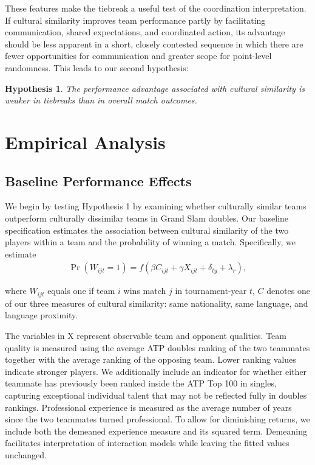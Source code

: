 \documentclass[10pt]{article}
\newtheorem{hypothesis}{Hypothesis}
\begin{document}
These features make the tiebreak a useful test of the coordination interpretation. If cultural similarity improves team performance partly by facilitating communication, shared expectations, and coordinated action, its advantage should be less apparent in a short, closely contested sequence in which there are fewer opportunities for communication and greater scope for point-level randomness. This leads to our second hypothesis:

\begin{hypothesis}
The performance advantage associated with cultural similarity is weaker in tiebreaks than in overall match outcomes.
\end{hypothesis}

\section{Empirical Analysis}

\subsection{Baseline Performance Effects}
We begin by testing Hypothesis 1 by examining whether culturally similar teams outperform culturally dissimilar teams in Grand Slam doubles. Our baseline specification estimates the association between cultural similarity of the two players within a team and the probability of winning a match. Specifically, we estimate
\begin{align}
  \operatorname{Pr}(W_{ijt} = 1) = f(\beta C_{ijt} + \gamma X_{ijt} + \delta_{ty} + \lambda_r) , 
\end{align}


where $W_{ijt}$ equals one if team $i$ wins match $j$ in tournament-year $t$, $C$ denotes one of our three measures of cultural similarity: same nationality, same language, and language proximity. %


The variables in X  represent observable team and opponent qualities. Team quality is measured using the average ATP doubles ranking of the two teammates together with the average ranking of the opposing team. Lower ranking values indicate stronger players. We additionally include an indicator for whether either teammate has previously been ranked inside the ATP Top 100 in singles, capturing exceptional individual talent that may not be reflected fully in doubles rankings. Professional experience is measured as the average number of years since the two teammates turned professional. To allow for diminishing returns, we include both the demeaned experience measure and its squared term. Demeaning facilitates interpretation of interaction models while leaving the fitted values unchanged.
\end{document}
